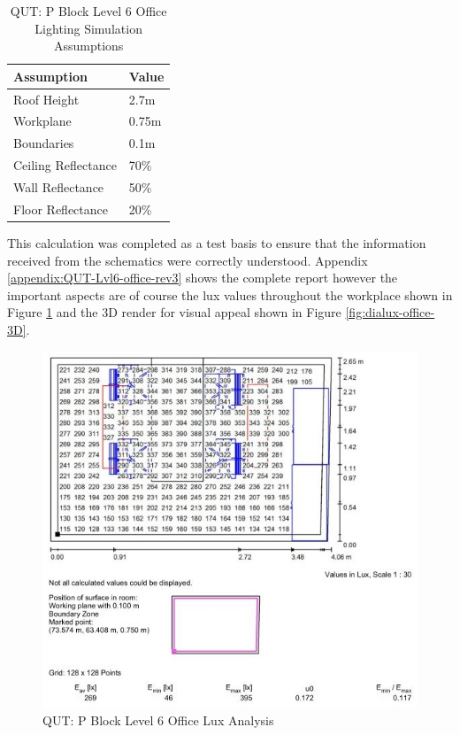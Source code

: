 \begin{table}[htb]
	\centering
	\renewcommand{\arraystretch}{2}
	\begin{tabular}{|l|l|}
		\hline
		\textbf{Assumption} & \textbf{Value} \\ \hline
		Roof Height         & 2.7m           \\ \hline
		Workplane           & 0.75m          \\ \hline
		Boundaries          & 0.1m           \\ \hline
		Ceiling Reflectance & 70\%           \\ \hline
		Wall Reflectance    & 50\%           \\ \hline
		Floor Reflectance   & 20\%           \\ \hline
	\end{tabular}
	\caption{QUT: P Block Level 6 Office Lighting Simulation Assumptions}
	\label{table:QUT-lvl6-office-assumptions}
\end{table} 
 
This calculation was completed as a test basis to ensure that the information received from the schematics were correctly understood. Appendix \ref{appendix:QUT-Lvl6-office-rev3} shows the complete report however the important aspects are of course the lux values throughout the workplace shown in Figure \ref{fig:dialux-office-workplane-summary} and the 3D render for visual appeal shown in Figure \ref{fig:dialux-office-3D}.  

\begin{figure}[H]
	\hfill\includegraphics[width = 150mm]{images/project-model/dialux-office-workplane-summary}\hspace*{\fill}
	\caption{QUT: P Block Level 6 Office Lux Analysis} 
	\label{fig:dialux-office-workplane-summary}
\end{figure}

